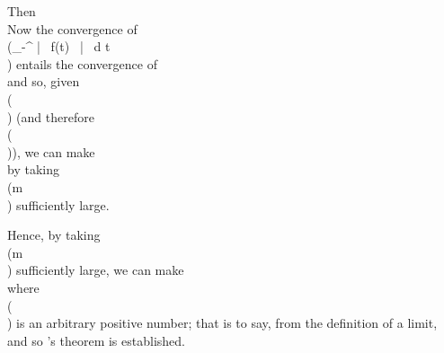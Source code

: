 Then
\\[ \begin{align*}
  \left| \, 
    \frac{1}{m}
    \! \int_{0}^{\frac{1}{2}\! \pi}
    \frac{\sin^{2} m\theta}{\sin^{2} \theta}
    \phi(\theta)
    \, d \theta
   \, \right| 
  &
  \leq
  \frac{1}{m}
  \! \int_{0}^{\frac{1}{2}\! \delta}
  \frac{\sin^{2} m\theta}{\sin^{2} \theta}
  \left| \,  \phi(\theta) \, \right| 
  \, d \theta
  +
  \frac{1}{m}
  \! \int_{\frac{1}{2}\delta}^{\frac{1}{2}\pi}\!
  \frac{\sin^{2} m\theta}{\sin^{2} \theta}
  \left| \, \phi(\theta) \, \right| 
  \, d \theta
  \\
  &
  <
  \frac{\eps}{m}
  \! \int_{0}^{\frac{1}{2} \delta}\!
  \frac{\sin^{2} m\theta}{\sin^{2} \theta}
  \, d \theta
  +
  \frac{1}{m \sin^{2} \frac{1}{2} \delta}
  \! \int_{\frac{1}{2} \delta}^{\frac{1}{2} \pi}\!
  \left| \, \phi(\theta) \, \right| 
  \, d \theta
  \\
  &
  \leq
  \frac{\eps}{m}
  \! \int_{0}^{\frac{1}{2} \pi}\!
  \frac{\sin^{2} m\theta}{\sin^{2} \theta}
  \, d \theta
  +
  \frac{1}{m \sin^{2} \frac{1}{2}\delta}
  \! \int_{0}^{\frac{1}{2} \pi}\!
  \left| \, \phi(\theta) \, \right| 
  \, d \theta
  \\
  &
  =
  \frac{1}{2} \pi \eps
  +
  \frac{1}{m \sin^{2} \frac{1}{2}\delta}
  \! \int_{0}^{\frac{1}{2} \pi}\!
  \left| \, \phi(\theta) \, \right| 
  \, d \theta
\end{align*} \\]

Now the convergence of
\\(\int_{-\pi}^{\pi} \left| \, f(t) \, \right|  \, d t\\)
entails the convergence of
\\[ 
\int_{0}^{\frac{1}{2} \pi}\!
\left| \, \phi(\theta) \, \right| 
\, d \theta,
\\] 
and so, given \\(\eps\\) (and therefore \\(\delta\\)), we can make
\\[ 
\frac{1}{2} \pi \eps
\sin^{2} \frac{1}{2} \delta
>
\int_{0}^{\frac{1}{2}\pi}\!
\left| \, \phi(\theta) \, \right| 
\, d \theta,
\\] 
by taking \\(m\\) sufficiently large.

Hence, by taking \\(m\\) sufficiently large, we can make
\\[ 
\left| \, 
  \frac{1}{m}
  \! \int_{0}^{\frac{1}{2} \pi}\!
  \frac{\sin^{2} m \theta}{\sin^{2} \theta}
  \phi(\theta)
  \, d \theta
 \, \right| 
<
\pi \eps,
\\] 
where \\(\eps\\) is an arbitrary positive number; that is to say, from the
definition of a limit,
\\[ 
\lim_{m \rightarrow \infty}
\frac{1}{m}
\! \int_{0}^{\frac{1}{2}\pi}\!
\frac{\sin^{2} m\theta}{\sin^{2} \theta}
\phi(\theta)
\, d \theta
=
0,
\\] 
and so \Fejer's theorem is established.
%
%

